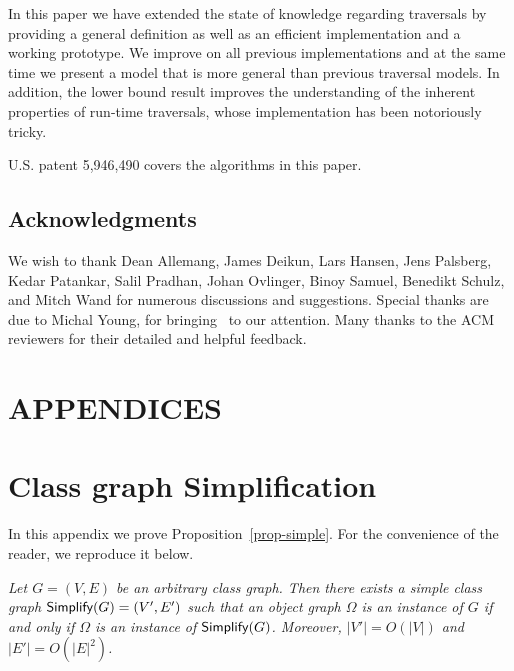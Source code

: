 In this paper we have extended the state of knowledge regarding
traversals by providing a general definition as well as an efficient
implementation and a working prototype.  We improve on all previous
implementations and at the same time we present a model that is more
general than previous traversal models.  In addition, the lower bound
result improves the understanding of the inherent properties of
run-time traversals, whose implementation has been notoriously tricky.


U.S. patent 5,946,490 covers the algorithms in this paper.


\vfill

\subsection*{Acknowledgments}
We wish to thank Dean Allemang, James Deikun, Lars Hansen, Jens
Palsberg, Kedar Patankar, Salil Pradhan, Johan Ovlinger, Binoy Samuel,
Benedikt Schulz, and Mitch Wand for numerous discussions and
suggestions. Special thanks are due to Michal Young, for
bringing~\cite{dragon-nfa-sim} to our attention.  Many thanks to the
ACM reviewers for their detailed and helpful feedback.

\newpage



\newpage
\appendix
\section*{APPENDICES}

\section{Class graph Simplification}
\label{sec-simpleten}
In this appendix we prove Proposition~\ref{prop-simple}.  For the
convenience of the reader, we reproduce it below.

  {\em Let $G=(V,E)$ be
an arbitrary class graph. Then there exists a simple class graph
$\mbox{\sf Simplify}(G)=(V',E')$ such that an object graph $\Omega$ is an instance
of $G$ if and only if $\Omega$ is an instance of
$\mbox{\sf Simplify}(G)$. Moreover, $|V'|=O(|V|)$ and $|E'|=O(|E|^2)$.  }

